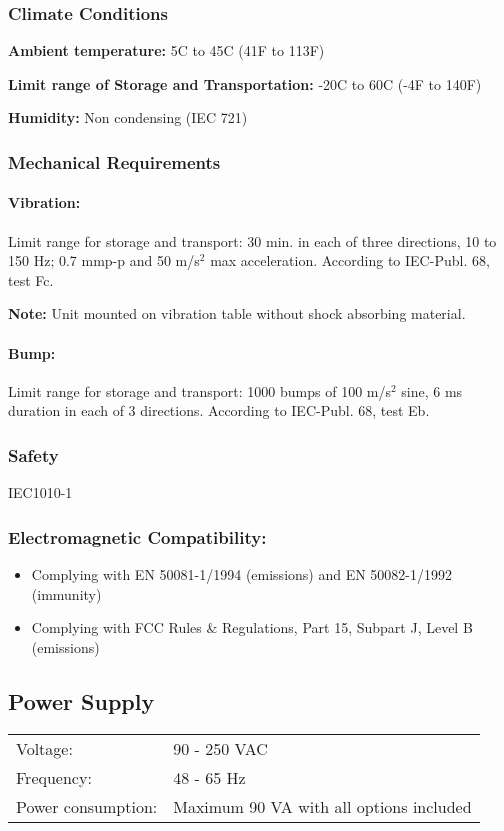 \subsubsection{Climate Conditions}
\textbf{Ambient temperature:} 5\degrees C to 45\degrees C (41\degrees F to 113\degrees F)

\textbf{Limit range of Storage and Transportation:} -20\degrees C to 60\degrees C (-4\degrees F to 140\degrees F)

\textbf{Humidity:} Non condensing (IEC 721)

\subsubsection{Mechanical Requirements}
\paragraph{Vibration:}
Limit range for storage and transport:
30 min. in each of three directions, 10 to 150 Hz; 0.7 mmp-p and 50 m/s$^2$
max acceleration.
According to IEC-Publ. 68, test Fc.

\textbf{Note:} Unit mounted on vibration table without shock absorbing material.

\paragraph{Bump:}
Limit range for storage and transport:
1000 bumps of 100 m/s$^2$
sine, 6 ms duration in each of 3 directions.
According to IEC-Publ. 68, test Eb.

\subsubsection{Safety}
IEC1010-1

\subsubsection{Electromagnetic Compatibility:}
\begin{itemize}
\item Complying with EN 50081-1/1994 (emissions) and EN 50082-1/1992 (immunity)
\item Complying with FCC Rules \& Regulations, Part 15, Subpart J, Level B (emissions)
\end{itemize}

\subsection{Power Supply}
\begin{tabular}{l l}
Voltage: 						& 90 - 250 VAC \\
Frequency: 					& 48 - 65 Hz \\
Power consumption: 	& Maximum 90 VA with all options included \\
\end{tabular}

